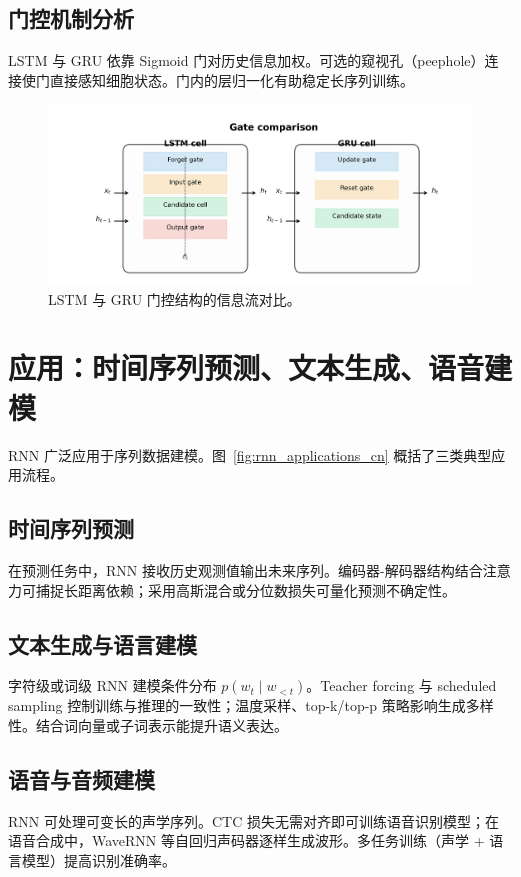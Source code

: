﻿\documentclass[UTF8,zihao=-4]{ctexart}
\begin{document}
\subsection{门控机制分析}
LSTM 与 GRU 依靠 Sigmoid 门对历史信息加权。可选的窥视孔（peephole）连接使门直接感知细胞状态。门内的层归一化有助稳定长序列训练。

\begin{figure}[H]
  \centering
  \includegraphics[width=0.85\linewidth]{lstm_gru_gate_comparison.png}
  \caption{LSTM 与 GRU 门控结构的信息流对比。}
  \label{fig:lstm_gru_cn}
\end{figure}
\FloatBarrier

\section{应用：时间序列预测、文本生成、语音建模}
RNN 广泛应用于序列数据建模。图~\ref{fig:rnn_applications_cn} 概括了三类典型应用流程。

\subsection{时间序列预测}
在预测任务中，RNN 接收历史观测值输出未来序列。编码器-解码器结构结合注意力可捕捉长距离依赖；采用高斯混合或分位数损失可量化预测不确定性。

\subsection{文本生成与语言建模}
字符级或词级 RNN 建模条件分布 $p(w_t \mid w_{<t})$。Teacher forcing 与 scheduled sampling 控制训练与推理的一致性；温度采样、top-k/top-p 策略影响生成多样性。结合词向量或子词表示能提升语义表达。

\subsection{语音与音频建模}
RNN 可处理可变长的声学序列。CTC 损失无需对齐即可训练语音识别模型；在语音合成中，WaveRNN 等自回归声码器逐样生成波形。多任务训练（声学 + 语言模型）提高识别准确率。
\end{document}
